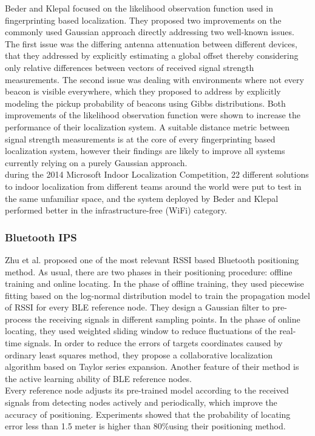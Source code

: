 Beder and Klepal \cite{Beder2012} focused on the likelihood observation function used in fingerprinting based localization. They proposed two improvements on the commonly used Gaussian approach directly addressing two well-known issues. The first issue was the differing antenna attenuation between different devices, that they addressed by explicitly estimating a global offset thereby considering only relative differences between vectors of received signal strength measurements. The second issue was dealing with environments where not every beacon is visible everywhere, which they proposed to address by explicitly modeling the pickup probability of beacons using Gibbs distributions. Both improvements of the likelihood observation function were shown to increase the performance of their localization system. A suitable distance metric between signal strength measurements is at the core of every fingerprinting based localization system, however their findings are likely to improve all systems currently relying on a purely Gaussian approach.\\
during the 2014 Microsoft Indoor Localization Competition, 22 different solutions to indoor localization from different teams around the world were put to test in the same unfamiliar space, and the system deployed by Beder and Klepal \cite{Beder2012} performed better in the infrastructure-free (WiFi) category.


\subsubsection{Bluetooth IPS}
\label{subsubsec:bt_soa}

Zhu et al. \cite{Zhu2014} proposed one of the most relevant RSSI based Bluetooth positioning method. As usual, there are two phases in their positioning procedure: offline training and online locating. In the phase of offline training, they used piecewise fitting based on the log-normal distribution model to train the propagation model of RSSI for every BLE reference node. They design a Gaussian filter to pre-process the receiving signals in different sampling points. In the phase of online locating, they used weighted sliding window to reduce fluctuations of the real-time signals. In order to reduce the errors of targets coordinates caused by ordinary least squares method, they propose a collaborative localization algorithm based on Taylor series expansion. Another feature of their method is the active learning ability of BLE reference nodes.\\
Every reference node adjusts its pre-trained model according to the received signals from detecting nodes actively and periodically, which improve the accuracy of positioning. Experiments showed that the probability of locating error less than 1.5 meter is higher than 80\%using their positioning method.

